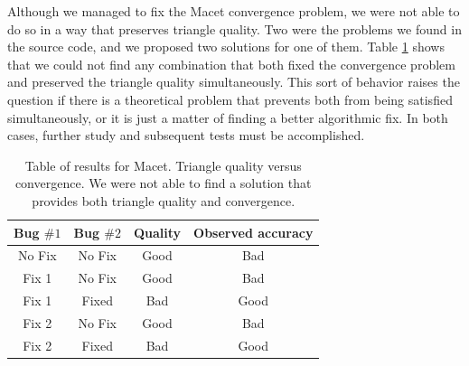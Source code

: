 Although we managed to fix the Macet convergence problem, we were not 
able to do so in a way that preserves triangle quality.
Two were the problems we found in the source code, and we proposed two 
solutions for one of them. Table \ref{tab:results-macet} shows that we could 
not find any combination that both fixed the convergence problem and preserved the 
triangle quality simultaneously. This sort of behavior raises the question if there 
is a theoretical problem that prevents both from being satisfied simultaneously, 
or it is just a matter of finding a better algorithmic fix. 
In both cases, further study and subsequent tests must be accomplished.


\begin{table}[t]
\caption{Table of results for Macet. Triangle quality versus 
convergence. We were not able to find a solution that provides 
both triangle quality and convergence.}
\centering
\begin{tabular}{cccc}
Bug $\#1$ & Bug $\#2$ & Quality & Observed accuracy \\
\hline
No Fix & No Fix & Good & Bad  \\
\hline
Fix 1 & No Fix & Good & Bad\\
Fix 1 & Fixed & Bad & Good\\
\hline
Fix 2 & No Fix & Good & Bad\\
Fix 2 & Fixed & Bad & Good\\
\hline
\end{tabular}
\label{tab:results-macet}
\end{table}